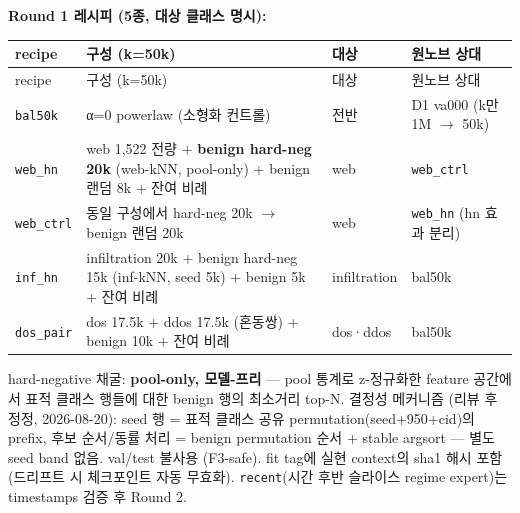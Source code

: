 \textbf{Round 1 레시피 (5종, 대상 클래스 명시):}

\begingroup
\footnotesize
\begin{longtable}{>{\raggedright\arraybackslash}p{}>{\raggedright\arraybackslash}p{}>{\raggedright\arraybackslash}p{}>{\raggedright\arraybackslash}p{}}
\toprule
recipe & 구성 (k=\allowbreak{}50k) & 대상 & 원노브 상대 \\ \midrule
\endfirsthead
recipe & 구성 (k=\allowbreak{}50k) & 대상 & 원노브 상대 \\ \midrule
\endhead
{}\texttt{bal50k} & α=\allowbreak{}0 powerlaw (소형화 컨트롤) & 전반 & D1 va000 (k만 1M \ensuremath{\rightarrow} 50k) \\
{}\texttt{web\_\allowbreak{}\allowbreak{}hn} & web 1,522 전량 +\allowbreak{} \textbf{benign hard-neg 20k} (web-kNN, pool-only) +\allowbreak{} benign 랜덤 8k +\allowbreak{} 잔여 비례 & web & \texttt{web\_\allowbreak{}\allowbreak{}ctrl\allowbreak{}} \\
{}\texttt{web\_\allowbreak{}\allowbreak{}ctrl\allowbreak{}} & 동일 구성에서 hard-neg 20k  \ensuremath{\rightarrow}  benign 랜덤 20k & web & \texttt{web\_\allowbreak{}\allowbreak{}hn} (hn 효과 분리) \\
{}\texttt{inf\_\allowbreak{}\allowbreak{}hn} & infiltration 20k +\allowbreak{} benign hard-neg 15k (inf-kNN, seed 5k) +\allowbreak{} benign 5k +\allowbreak{} 잔여 비례 & infiltration & bal50k \\
{}\texttt{dos\_\allowbreak{}\allowbreak{}pair\allowbreak{}} & dos 17.5k +\allowbreak{} ddos 17.5k (혼동쌍) +\allowbreak{} benign 10k +\allowbreak{} 잔여 비례 & dos·ddos & bal50k \\
\bottomrule
\end{longtable}
\endgroup
\par\noindent \textbullet\enspace hard-negative 채굴: \textbf{pool-only, 모델-프리} — pool 통계로 z-정규화한 feature 공간에서 표적 클래스 행들에 대한 benign 행의 최소거리 top-N. 결정성 메커니즘 (리뷰 후 정정, 2026-08-20): seed 행 =\allowbreak{} 표적 클래스 공유 permutation(seed+\allowbreak{}950+\allowbreak{}cid)의 prefix, 후보 순서/\allowbreak{}동률 처리 =\allowbreak{} benign permutation 순서 +\allowbreak{} stable argsort — 별도 seed band 없음. val/\allowbreak{}test 불사용 (F3-safe). fit tag에 실현 context의 sha1 해시 포함 (드리프트 시 체크포인트 자동 무효화). \texttt{recent}(시간 후반 슬라이스 regime expert)는 timestamps 검증 후 Round 2.


